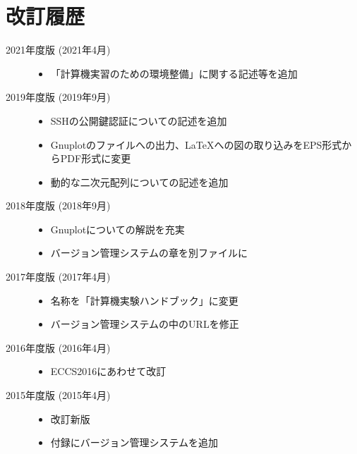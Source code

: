 \section*{改訂履歴}

\noindent
\begin{description}
\item[2021年度版 (2021年4月)] \mbox{}
  
  \begin{itemize}
  \item 「計算機実習のための環境整備」に関する記述等を追加
  \end{itemize}

\item[2019年度版 (2019年9月)] \mbox{}
  
  \begin{itemize}
  \item SSHの公開鍵認証についての記述を追加
  \item Gnuplotのファイルへの出力、\LaTeX への図の取り込みをEPS形式からPDF形式に変更
  \item 動的な二次元配列についての記述を追加
  \end{itemize}

\item[2018年度版 (2018年9月)] \mbox{}
  
  \begin{itemize}
  \item Gnuplotについての解説を充実
  \item バージョン管理システムの章を別ファイルに
  \end{itemize}

\item[2017年度版 (2017年4月)] \mbox{}
  
  \begin{itemize}
  \item 名称を「計算機実験ハンドブック」に変更
  \item バージョン管理システムの中のURLを修正
  \end{itemize}

\item[2016年度版 (2016年4月)] \mbox{}

  \begin{itemize}
  \item ECCS2016にあわせて改訂
  \end{itemize}

\item[2015年度版 (2015年4月)] \mbox{}

  \begin{itemize}
  \item 改訂新版
  \item 付録にバージョン管理システムを追加
  \end{itemize}

\end{description}
